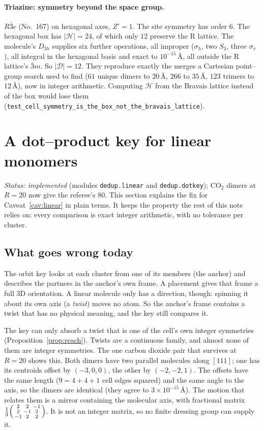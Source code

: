 \documentclass[11pt]{article}
\theoremstyle{definition}
\newcommand{\Hgrp}{\mathcal{H}}
\newcommand{\Dgrp}{\mathcal{D}}
\begin{document}
\paragraph{Triazine: symmetry beyond the space group.} $R\bar3c$ (No.~167) on
hexagonal axes, $Z'=1$. The site symmetry has order $6$. The hexagonal box has
$|\Hgrp|=24$, of which only $12$ preserve the R lattice. The molecule's
$D_{3h}$ supplies six further operations, all improper ($\sigma_h$, two $S_3$,
three $\sigma_v$), all integral in the hexagonal basis and exact to
$10^{-15}$\,\AA, all outside the R lattice's $\bar3m$. So $|\Dgrp|=12$. They
reproduce exactly the merges a Cartesian point--group search used to find
($61$ unique dimers to $20$\,\AA, $266$ to $35$\,\AA, $123$ trimers to
$12$\,\AA), now in integer arithmetic. Computing $\Hgrp$ from the Bravais
lattice instead of the box would lose them
(\texttt{test\_cell\_symmetry\_is\_the\_box\_not\_the\_bravais\_lattice}).

\section{A dot--product key for linear monomers}\label{sec:linear}

\emph{Status: implemented} (modules \texttt{dedup.linear} and
\texttt{dedup.dotkey}); CO$_2$ dimers at $R=20$ now give the referee's $80$.
This section explains the fix for Caveat~\ref{cav:linear} in plain terms. It keeps the property the rest of
this note relies on: every comparison is exact integer arithmetic, with no
tolerance per cluster.

\subsection{What goes wrong today}

The orbit key looks at each cluster from one of its members (the anchor) and
describes the partners in the anchor's own frame. A placement gives that frame
a full 3D orientation. A linear molecule only has a direction, though: spinning
it about its own axis (a \emph{twist}) moves no atom. So the anchor's frame
contains a twist that has no physical meaning, and the key still compares it.

The key can only absorb a twist that is one of the cell's own integer
symmetries (Proposition~\ref{prop:reach}). Twists are a continuous family, and
almost none of them are integer symmetries. The one carbon dioxide pair that
survives at $R=20$ shows this. Both dimers have two parallel molecules along
$[111]$; one has its centroids offset by $(-3,0,0)$, the other by $(-2,-2,1)$.
The offsets have the same length ($9=4+4+1$ cell edges squared) and the same
angle to the axis, so the dimers are identical (they agree to
$3\times10^{-15}$\,\AA). The motion that relates them is a mirror containing the
molecular axis, with fractional matrix
$\tfrac13\begin{psmallmatrix}2&2&-1\\2&-1&2\\-1&2&2\end{psmallmatrix}$. It is not
an integer matrix, so no finite dressing group can supply it.
\end{document}
